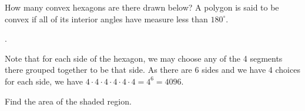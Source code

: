 \documentclass[11pt]{article}
\begin{document}
\begin{problem} How many convex hexagons are there drawn below? A polygon is said to be convex if all of its interior angles have measure less than $180^{\circ}$. %
\end{problem}

.
\begin{solution}
Note that for each side of the hexagon, we may choose any of the 4 segments there grouped together to be that side. As there are 6 sides and we have 4 choices for each side, we have $4 \cdot 4 \cdot 4 \cdot 4 \cdot 4 \cdot 4 = 4^6 = \boxed{4096}$.
\end{solution}

\begin{problem}Find the area of the shaded region.
    \begin{center}
    \end{center}
\end{problem}
\end{document}
